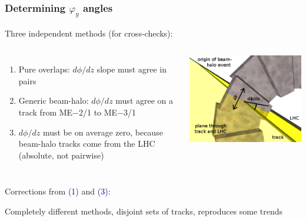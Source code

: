 \documentclass[compress]{beamer}
\begin{document}
\begin{frame}
\frametitle{Determining $\varphi_y$ angles}
\small

Three independent methods (for cross-checks):
\begin{columns}

\begin{enumerate}
\item Pure overlaps: $d\phi/dz$ slope must agree in pairs
\item Generic beam-halo: $d\phi/dz$ must agree on a track from ME$-$2/1 to ME$-$3/1
\item $d\phi/dz$ must be on average zero, because beam-halo tracks come from the LHC (absolute, not pairwise)
\end{enumerate}

\includegraphics[width=\linewidth]{track_lhc_plane_closeup.png}
\end{columns}

\vspace{-0.2 cm}
\begin{columns}
\begin{center}
Corrections from \textcolor{darkblue}{(1)} and \textcolor{darkblue}{(3)}:

\vspace{0.3 cm}
\scriptsize Completely different methods, disjoint sets of tracks, reproduces some trends


\end{center}
\end{columns}
\end{frame}
\end{document}
